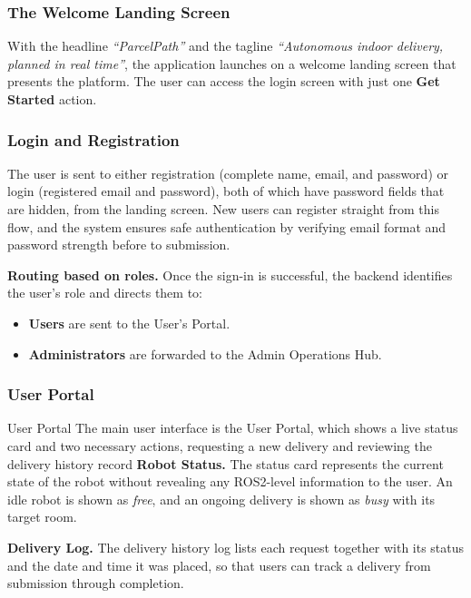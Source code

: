 \subsubsection{The Welcome Landing Screen}

With the headline \textit{``ParcelPath''} and the tagline \textit{``Autonomous indoor delivery, planned in real time''}, the application launches on a welcome landing screen that presents the platform. The user can access the login screen with just one \textbf{Get Started} action.


\subsubsection{Login and Registration}
The user is sent to either registration (complete name, email, and password) or login (registered email and password), both of which have password fields that are hidden, from the landing screen. New users can register straight from this flow, and the system ensures safe authentication by verifying email format and password strength before to submission.

\textbf{Routing based on roles.} Once the sign-in is successful, the backend identifies the user’s role and directs them to:

\begin{itemize}[noitemsep]
	\item \textbf{Users} are sent to the User’s Portal.
	\item \textbf{Administrators} are forwarded to the Admin Operations Hub.
\end{itemize}

\subsubsection{User Portal}
\label{sec:user_portal}
User Portal The main user interface is the User Portal, which shows a live status card and two necessary actions, requesting a new delivery and reviewing the delivery history record \textbf{Robot Status.} The status card represents the current state of the robot without revealing any ROS2-level information to the user. An idle robot is shown as \textit{free}, and an ongoing delivery is shown as \textit{busy} with its target room.

\textbf{Delivery Log.} The delivery history log lists each request together with its status and the date and time it was placed, so that users can track a delivery from submission through completion.

